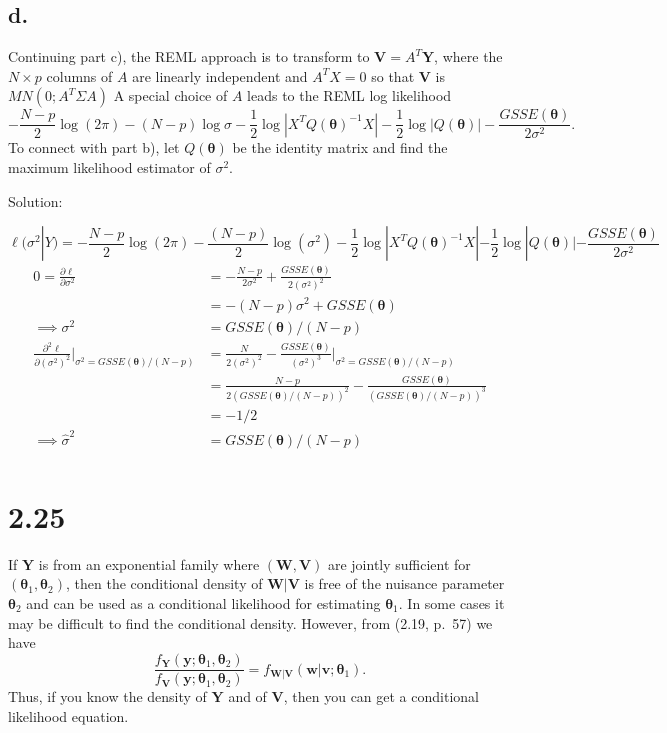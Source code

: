\documentclass[
  letterpaper,
  DIV=11,
  numbers=noendperiod]{scrreprt}
\begin{document}
\hypertarget{d.}{%
\subsection{d.}\label{d.}}

Continuing part c), the REML approach is to transform to
\(\mathbf V = A^T \mathbf Y\), where the \(N \times p\) columns of \(A\)
are linearly independent and \(A^T X =0\) so that \(\mathbf V\) is
\(MN(0;A^T \Sigma A)\) A special choice of \(A\) leads to the REML log
likelihood
\[-\frac{N-p}{2}\log(2\pi) -(N-p)\log \sigma - \frac{1}{2} \log |X^T Q(\boldsymbol{\theta} )^{-1}X|-\frac{1}{2} \log |Q(\boldsymbol{\theta})| - \frac{GSSE(\boldsymbol{\theta})}{2 \sigma^2}.\]
To connect with part b), let \(Q(\boldsymbol{\theta})\) be the identity
matrix and find the maximum likelihood estimator of \(\sigma^2\).

Solution:

\[\ell(\sigma^2 | Y) = -\frac{N-p}{2}\log(2\pi) -\frac{(N-p)}{2}\log (\sigma^2) - \frac{1}{2} \log |X^T Q(\boldsymbol{\theta} )^{-1}X|-\frac{1}{2} \log |Q(\boldsymbol{\theta})| - \frac{GSSE(\boldsymbol{\theta})}{2 \sigma^2}\]
\[
\begin{aligned}
0=\frac{\partial \ell}{\partial \sigma^2} &= - \frac{N-p}{2 \sigma^2}+ \frac{GSSE(\boldsymbol{\theta})}{2(\sigma^2)^2}\\
&=-(N-p)\sigma^2 +GSSE(\boldsymbol \theta) \\
\implies \sigma^2 &= GSSE(\boldsymbol \theta)/(N-p) \\
\frac{\partial^2 \ell}{\partial (\sigma^2)^2} \bigg|_{\sigma^2=GSSE(\boldsymbol \theta)/(N-p)}&= \frac{N}{2 (\sigma^2)^2}-\frac{GSSE(\boldsymbol{\theta})}{(\sigma^2)^3}\bigg|_{\sigma^2=GSSE(\boldsymbol \theta)/(N-p)}\\
&= \frac{N-p}{2 (GSSE(\boldsymbol \theta)/(N-p))^2}-\frac{GSSE(\boldsymbol{\theta})}{(GSSE(\boldsymbol \theta)/(N-p))^3} \\
&= -1/2 \\
\implies \hat \sigma^2 &= GSSE(\boldsymbol \theta)/(N-p) \\
\end{aligned}
\]

\newpage

\hypertarget{section-9}{%
\section{2.25}\label{section-9}}

If \(\mathbf Y\) is from an exponential family where
\((\mathbf W, \mathbf V)\) are jointly sufficient for
\((\boldsymbol \theta_1, \boldsymbol \theta_2)\), then the conditional
density of \(\mathbf W | \mathbf V\) is free of the nuisance parameter
\(\boldsymbol \theta_2\) and can be used as a conditional likelihood for
estimating \(\boldsymbol \theta_1\). In some cases it may be difficult
to find the conditional density. However, from (2.19, p.~57) we have
\[\frac{f_{\mathbf Y}(\mathbf y; \boldsymbol \theta_1, \boldsymbol \theta_2)}{f_{\mathbf V}(\mathbf y; \boldsymbol \theta_1, \boldsymbol \theta_2)}= f_{\mathbf{W|V}}(\mathbf{w|v}; \boldsymbol \theta_1).\]
Thus, if you know the density of \(\mathbf Y\) and of \(\mathbf V\),
then you can get a conditional likelihood equation.
\end{document}
